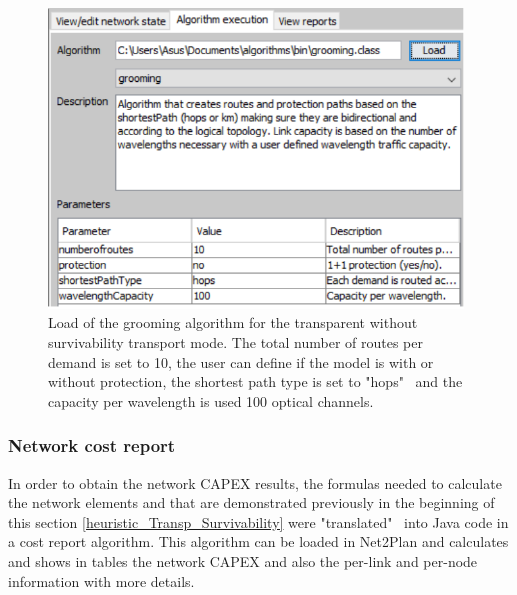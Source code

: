 \begin{figure}[H]
\centering
\includegraphics[width=11cm]{sdf/heuristic/transparent_survivability/figures/grooming_transparent_surv4}
\caption{Load of the grooming algorithm for the transparent without survivability transport mode. The total number of routes per demand is set to 10, the user can define if the model is with or without protection, the shortest path type is set to "hops" \ and the capacity per wavelength is used 100 optical channels.}
\label{grooming_transparent_surv4}
\end{figure}

\newpage
\subsubsection{Network cost report}

\vspace{11pt}
In order to obtain the network CAPEX results, the formulas needed to calculate the network elements and that are demonstrated previously in the beginning of this section \ref{heuristic_Transp_Survivability} were "translated" \ into Java code in a cost report algorithm. This algorithm can be loaded in Net2Plan and calculates and shows in tables the network CAPEX and also the per-link and per-node information with more details.

